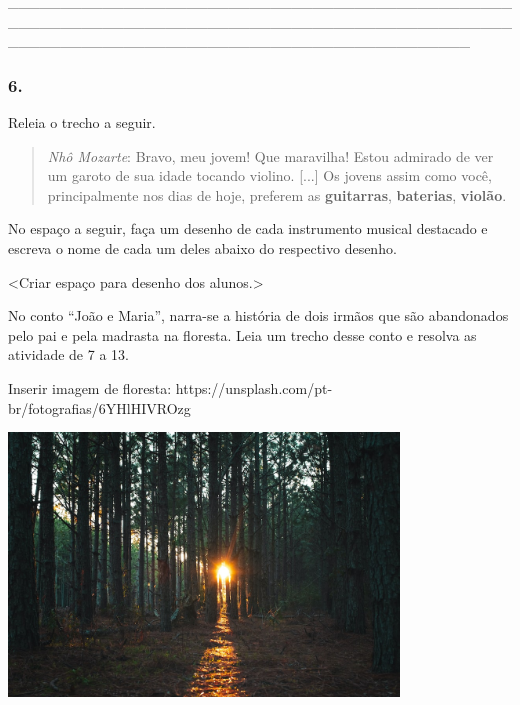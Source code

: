\_\_\_\_\_\_\_\_\_\_\_\_\_\_\_\_\_\_\_\_\_\_\_\_\_\_\_\_\_\_\_\_\_\_\_\_\_\_\_\_\_\_\_\_\_\_\_\_\_\_\_\_\_\_\_\_\_\_\_\_\_\_\_\_\_\_\_\_\_\_\_\_\_\_\_\_\_\_\_\_\_\_\_\_\_\_\_\_\_\_\_\_\_\_\_\_\_\_\_\_\_\_\_\_\_\_\_\_\_\_\_\_\_\_\_\_\_\_\_\_\_\_\_\_\_\_\_\_\_\_\_\_\_\_\_\_\_\_\_\_

\subsubsection{6. }\label{section-21}

Releia o trecho a seguir.

\begin{quote}
\emph{Nhô Mozarte}: Bravo, meu jovem! Que maravilha! Estou admirado de
ver um garoto de sua idade tocando violino. {[}...{]} Os jovens assim
como você, principalmente nos dias de hoje, preferem as
\textbf{guitarras}, \textbf{baterias}, \textbf{violão}.
\end{quote}

No espaço a seguir, faça um desenho de cada instrumento musical
destacado e escreva o nome de cada um deles abaixo do respectivo desenho.

\textless{}Criar espaço para desenho dos alunos.\textgreater{}

No conto ``João e Maria'', narra-se a história de dois irmãos que são
abandonados pelo pai e pela madrasta na floresta. Leia um trecho desse
conto e resolva as atividade de 7 a 13.

Inserir imagem de floresta:
https://unsplash.com/pt-br/fotografias/6YHlHIVROzg

\includegraphics[width=4.08333in,height=2.76048in]{media/image3.jpeg}

